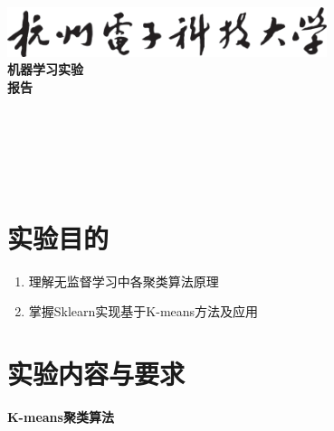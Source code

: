 \documentclass[a4paper]{ctexart}
\begin{document}
  \begin{titlepage}
      \songti
      \begin{center}
        \vspace*{2cm}
        \includegraphics[width=0.7\textwidth]{../HDU.png}\\
        \vspace*{1cm}
        {\fontsize{36pt}{0}
          \textbf{机器学习实验\\报\quad 告\\}
        }
        \vspace*{12cm}
        {\fontsize{18pt}{0}
           \underline{}\\
          \vspace*{0.5cm}
           \underline{}\\
          \vspace*{0.5cm}
           \underline{}\\
          \vspace*{0.5cm}
           \underline{}\\
          \vspace*{0.5cm}
           \underline{}\\
        }
      \end{center}
  \end{titlepage}


  \newpage
  \section{实验目的}
  \begin{enumerate}
    \item 理解无监督学习中各聚类算法原理
    \item 掌握Sklearn实现基于K-means方法及应用
  \end{enumerate}

  \section{实验内容与要求}
  \textbf{K-means聚类算法}
\end{document}
